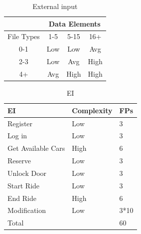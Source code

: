 \documentclass{article}
\begin{document}
\begin{itemize}
\begin{table}[h]
			\centering
			\caption{External input}
			\label{my-label}
			\begin{tabular}{|c|l|c|c|c|}
				\hline
				\multicolumn{2}{|c|}{}           & \multicolumn{3}{c|}{Data Elements} \\ \hline
				\multicolumn{2}{|c|}{File Types} & 1-5       & 5-15       & 16+       \\ \hline
				\multicolumn{2}{|c|}{0-1}        & Low       & Low        & Avg       \\ \hline
				\multicolumn{2}{|c|}{2-3}        & Low       & Avg        & High      \\ \hline
				\multicolumn{2}{|c|}{4+}         & Avg       & High       & High      \\ \hline
			\end{tabular}
		\end{table}
		\begin{table}[h]
			\centering
			\caption{EI}
			\label{my-label}
			\begin{tabular}{|l|l|l|}
				\hline
				EI                 & Complexity & FPs \\ \hline
				Register           & Low        & 3   \\ \hline
				Log in             & Low        & 3   \\ \hline
				Get Available Cars & High       & 6   \\ \hline
				Reserve            & Low        & 3   \\ \hline
				Unlock Door        & Low        & 3   \\ \hline
				Start Ride         & Low        & 3   \\ \hline
				End Ride           & High       & 6   \\ \hline
				Modification           & Low       & 3*10  \\ \hline
				\multicolumn{2}{|l|}{Total}     & 60  \\ \hline
			\end{tabular}
		\end{table}
	\end{itemize}
\end{document}
